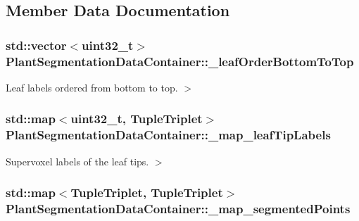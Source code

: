 \subsection{Member Data Documentation}
\hypertarget{classPlantSegmentationDataContainer_a6df4ddb8fefd98b15d007bd9fdb16413}{
\subsubsection[{\-\_\-leaf\-Order\-Bottom\-To\-Top}]{\setlength{\rightskip}{0pt plus 5cm}std\-::vector$<$uint32\-\_\-t$>$ Plant\-Segmentation\-Data\-Container\-::\-\_\-leaf\-Order\-Bottom\-To\-Top}}\label{classPlantSegmentationDataContainer_a6df4ddb8fefd98b15d007bd9fdb16413}


Leaf labels ordered from bottom to top. $>$ 

\hypertarget{classPlantSegmentationDataContainer_ad0a98dbe2681b9b3ee693b6c5b37e667}{
\subsubsection[{\-\_\-map\-\_\-leaf\-Tip\-Labels}]{\setlength{\rightskip}{0pt plus 5cm}std\-::map$<$uint32\-\_\-t, {\bf Tuple\-Triplet}$>$ Plant\-Segmentation\-Data\-Container\-::\-\_\-map\-\_\-leaf\-Tip\-Labels}}\label{classPlantSegmentationDataContainer_ad0a98dbe2681b9b3ee693b6c5b37e667}


Supervoxel labels of the leaf tips. $>$ 

\hypertarget{classPlantSegmentationDataContainer_a69cd3fc8af8419f86977a1a1cbd92dda}{
\subsubsection[{\-\_\-map\-\_\-segmented\-Points}]{\setlength{\rightskip}{0pt plus 5cm}std\-::map$<${\bf Tuple\-Triplet}, {\bf Tuple\-Triplet}$>$ Plant\-Segmentation\-Data\-Container\-::\-\_\-map\-\_\-segmented\-Points}}\label{classPlantSegmentationDataContainer_a69cd3fc8af8419f86977a1a1cbd92dda}


